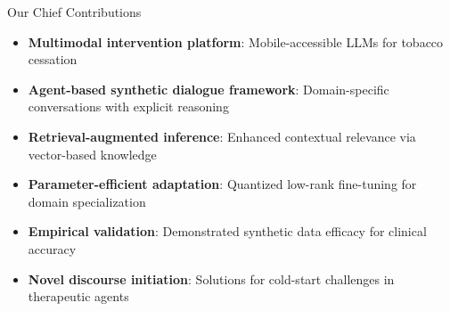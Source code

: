 \begin{frame}{Our Chief Contributions}
  \begin{itemize}
    \item \textbf{Multimodal intervention platform}: Mobile-accessible LLMs for tobacco cessation
    
    \item \textbf{Agent-based synthetic dialogue framework}: Domain-specific conversations with explicit reasoning
    
    \item \textbf{Retrieval-augmented inference}: Enhanced contextual relevance via vector-based knowledge
    
    \item \textbf{Parameter-efficient adaptation}: Quantized low-rank fine-tuning for domain specialization
    
    \item \textbf{Empirical validation}: Demonstrated synthetic data efficacy for clinical accuracy
    
    \item \textbf{Novel discourse initiation}: Solutions for cold-start challenges in therapeutic agents
  \end{itemize}
\end{frame}